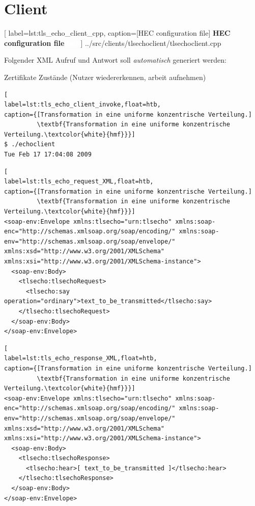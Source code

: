 \clearpage
\section{Client}


	[
	label=lst:tls_echo_client_cpp,
	caption={[HEC configuration file]
	\textbf{HEC configuration file\textcolor{white}{hmf}}}
	]
{../src/clients/tlsechoclient/tlsechoclient.cpp}



Folgender XML Aufruf und Antwort soll \textit{automatisch} generiert werden:






Zertifikate
Zustände (Nutzer wiedererkennen, arbeit aufnehmen)




\begin{lstlisting}[
label=lst:tls_echo_client_invoke,float=htb,
caption={[Transformation in eine uniforme konzentrische Verteilung.]
         \textbf{Transformation in eine uniforme konzentrische Verteilung.\textcolor{white}{hmf}}}]
$ ./echoclient
Tue Feb 17 17:04:08 2009
\end{lstlisting}






\begin{lstlisting}[
label=lst:tls_echo_request_XML,float=htb,
caption={[Transformation in eine uniforme konzentrische Verteilung.]
         \textbf{Transformation in eine uniforme konzentrische Verteilung.\textcolor{white}{hmf}}}]
<soap-env:Envelope xmlns:tlsecho="urn:tlsecho" xmlns:soap-enc="http://schemas.xmlsoap.org/soap/encoding/" xmlns:soap-env="http://schemas.xmlsoap.org/soap/envelope/" xmlns:xsd="http://www.w3.org/2001/XMLSchema" xmlns:xsi="http://www.w3.org/2001/XMLSchema-instance">
  <soap-env:Body>
    <tlsecho:tlsechoRequest>
      <tlsecho:say operation="ordinary">text_to_be_transmitted</tlsecho:say>
    </tlsecho:tlsechoRequest>
  </soap-env:Body>
</soap-env:Envelope>
\end{lstlisting}






\begin{lstlisting}[
label=lst:tls_echo_response_XML,float=htb,
caption={[Transformation in eine uniforme konzentrische Verteilung.]
         \textbf{Transformation in eine uniforme konzentrische Verteilung.\textcolor{white}{hmf}}}]
<soap-env:Envelope xmlns:tlsecho="urn:tlsecho" xmlns:soap-enc="http://schemas.xmlsoap.org/soap/encoding/" xmlns:soap-env="http://schemas.xmlsoap.org/soap/envelope/" xmlns:xsd="http://www.w3.org/2001/XMLSchema" xmlns:xsi="http://www.w3.org/2001/XMLSchema-instance">
  <soap-env:Body>
    <tlsecho:tlsechoResponse>
      <tlsecho:hear>[ text_to_be_transmitted ]</tlsecho:hear>
    </tlsecho:tlsechoResponse>
  </soap-env:Body>
</soap-env:Envelope>
\end{lstlisting}

